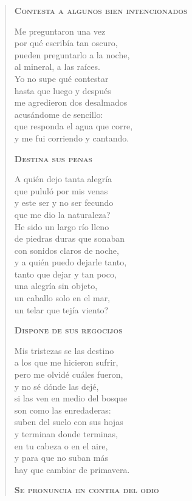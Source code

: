 \documentclass[12pt]{article}
\begin{document}
\begin{verse}
{\bfseries\scshape {Contesta a algunos bien intencionados}}

Me preguntaron una vez\\
por qué escribía tan oscuro,\\
pueden preguntarlo a la noche,\\
al mineral, a las raíces.\\
Yo no supe qué contestar\\
hasta que luego y después\\
me agredieron dos desalmados\\
acusándome de sencillo:\\
que responda el agua que corre,\\
y me fui corriendo y cantando.  

{\bfseries\scshape {Destina sus penas}}

A quién dejo tanta alegría\\
que pululó por mis venas\\
y este ser y no ser fecundo\\
que me dio la naturaleza?\\
He sido un largo río lleno\\
de piedras duras que sonaban\\
con sonidos claros de noche,\\
y a quién puedo dejarle tanto,\\
tanto que dejar y tan poco,\\
una alegría sin objeto,\\
un caballo solo en el mar,\\
un telar que tejía viento?  

{\bfseries\scshape {Dispone de sus regocijos}}

Mis tristezas se las destino\\
a los que me hicieron sufrir,\\
pero me olvidé cuáles fueron,\\
y no sé dónde las dejé,\\
si las ven en medio del bosque\\
son como las enredaderas:\\
suben del suelo con sus hojas\\
y terminan donde terminas,\\
en tu cabeza o en el aire,\\
y para que no suban más\\
hay que cambiar de primavera.  

{\bfseries\scshape {Se pronuncia en contra del odio}}


\end{verse}
\end{document}
